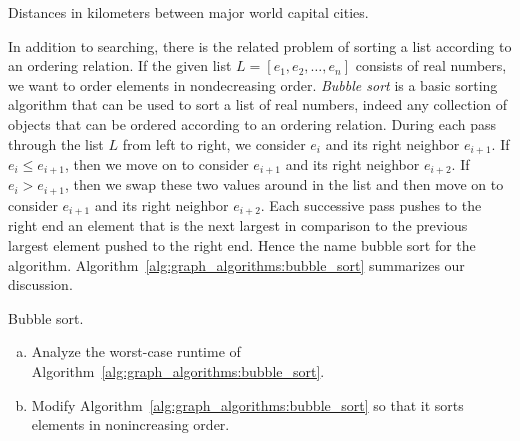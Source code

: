 \begin{problem}
\begin{landscape}
\begin{table}[!htbp]
\centering
{}
{\tiny

}
\caption{Distances in kilometers between major world capital cities.}
\label{tab:graph_algorithms:capital_cities_distance}
\end{table}
\end{landscape}

\item In addition to searching, there is the related problem of
  sorting a list according to an ordering relation. If the given list
  $L = [e_1, e_2, \dots, e_n]$ consists of real numbers, we want to
  order elements in nondecreasing order. \emph{Bubble sort} is a basic
  sorting algorithm that can be used to sort a list of real numbers,
  indeed any collection of objects that can be ordered according to an
  ordering relation. During each pass through the list $L$ from left
  to right, we consider $e_i$ and its right neighbor $e_{i+1}$. If
  $e_i \leq e_{i+1}$, then we move on to consider $e_{i+1}$ and its
  right neighbor $e_{i+2}$. If $e_i > e_{i+1}$, then we swap these two
  values around in the list and then move on to consider $e_{i+1}$ and
  its right neighbor $e_{i+2}$. Each successive pass pushes to the
  right end an element that is the next largest in comparison to the
  previous largest element pushed to the right end. Hence the name
  bubble sort for the
  algorithm. Algorithm~\ref{alg:graph_algorithms:bubble_sort}
  summarizes our discussion.
  \begin{algorithm}[!htbp]
    
    \caption{Bubble sort.}
    \label{alg:graph_algorithms:bubble_sort}
  \end{algorithm}
  \begin{enumerate}[(a)]
  \item Analyze the worst-case runtime of
    Algorithm~\ref{alg:graph_algorithms:bubble_sort}.

  \item Modify Algorithm~\ref{alg:graph_algorithms:bubble_sort} so
    that it sorts elements in nonincreasing order.


\end{enumerate}
\end{problem}

